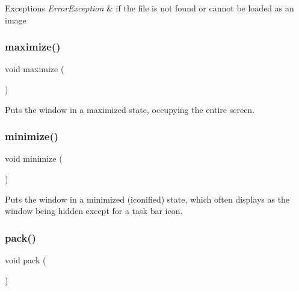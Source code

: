 \begin{DoxyExceptions}{Exceptions}
{\em Error\+Exception} & if the file is not found or cannot be loaded as an image \\
\hline
\end{DoxyExceptions}
\mbox{\label{classGWindow_a1aa481996525792213f28d91fbb4894b}} 
\subsubsection{\texorpdfstring{maximize()}{maximize()}}
{\footnotesize\ttfamily void maximize (\begin{DoxyParamCaption}{ }\end{DoxyParamCaption})\hspace{0.3cm}{\ttfamily [virtual]}}



Puts the window in a maximized state, occupying the entire screen. 

\mbox{\label{classGWindow_a85ffaebe489c0ecf8051715ecf59babb}} 
\subsubsection{\texorpdfstring{minimize()}{minimize()}}
{\footnotesize\ttfamily void minimize (\begin{DoxyParamCaption}{ }\end{DoxyParamCaption})\hspace{0.3cm}{\ttfamily [virtual]}}



Puts the window in a minimized (iconified) state, which often displays as the window being hidden except for a task bar icon. 

\mbox{\label{classGWindow_a915ffc82b17862ab1d2a466a79d23a3f}} 
\subsubsection{\texorpdfstring{pack()}{pack()}}
{\footnotesize\ttfamily void pack (\begin{DoxyParamCaption}{ }\end{DoxyParamCaption})\hspace{0.3cm}{\ttfamily [virtual]}}




